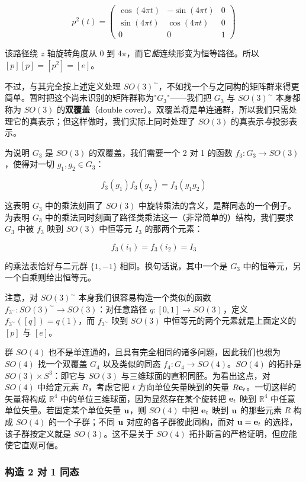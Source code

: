 \[
p^{2}(t)=\begin{pmatrix}\cos(4\pi t) & -\sin(4\pi t) & 0\\ \sin(4\pi t) & \cos(4\pi t) & 0\\ 0 & 0 & 1\end{pmatrix}
\]

该路径绕 $z$ 轴旋转角度从 0 到 $4\pi$，而它\emph{能}连续形变为恒等路径。所以 $[p][p]=[p^{2}]=[e]$。

不过，与其完全按上述定义处理 $SO(3)^{\sim}$，不如找一个与之同构的矩阵群来得更简单。暂时把这个尚未识别的矩阵群称为"$G_{3}$"——我们把 $G_{3}$ 与 $SO(3)^{\sim}$ 本身都称为 $SO(3)$ 的\textbf{双覆盖}（double cover）。双覆盖将是单连通群，所以我们只需处理它的真表示；但这样做时，我们实际上同时处理了 $SO(3)$ 的真表示\emph{与}投影表示。

为说明 $G_{3}$ 是 $SO(3)$ 的双覆盖，我们需要一个 2 对 1 的函数 $f_{3}:G_{3}\to SO(3)$，使得对一切 $g_{1},g_{2}\in G_{3}$：

\[
f_{3}(g_{1})f_{3}(g_{2})=f_{3}(g_{1}g_{2})
\]

这表明 $G_{3}$ 中的乘法刻画了 $SO(3)$ 中旋转乘法的含义，是群同态的一个例子。为表明 $G_{3}$ 中的乘法同时刻画了路径类乘法这一（非常简单的）结构，我们要求 $G_{3}$ 中被 $f_{3}$ 映到 $SO(3)$ 中恒等元 $I_{3}$ 的那两个元素：

\[
f_{3}(i_{1})=f_{3}(i_{2})=I_{3}
\]

的乘法表恰好与二元群 $\{1,-1\}$ 相同。换句话说，其中一个是 $G_{3}$ 中的恒等元，另一个自乘则给出恒等元。

注意，对 $SO(3)^{\sim}$ 本身我们很容易构造一个类似的函数 $f_{3^{\sim}}:SO(3)^{\sim}\to SO(3)$：对任意路径 $q:[0,1]\to SO(3)$，定义 $f_{3^{\sim}}([q])=q(1)$，而 $f_{3^{\sim}}$ 映到 $SO(3)$ 中恒等元的两个元素就是上面定义的 $[p]$ 与 $[e]$。

群 $SO(4)$ 也不是单连通的，且具有完全相同的诸多问题，因此我们也想为 $SO(4)$ 找一个双覆盖 $G_{4}$ 以及类似的同态 $f_{4}:G_{4}\to SO(4)$。$SO(4)$ 的拓扑是 $SO(3)\times S^{3}$：即它与 $SO(3)$ 与三维球面的直积同胚。为看出这点，对 $SO(4)$ 中给定元素 $R$，考虑它把 $t$ 方向单位矢量映到的矢量 $R\mathbf{e}_{t}$。一切这样的矢量将构成 $\mathbb{R}^{4}$ 中的单位三维球面，因为显然存在某个旋转把 $\mathbf{e}_{t}$ 映到 $\mathbb{R}^{4}$ 中任意单位矢量。若固定某个单位矢量 $\mathbf{u}$，则 $SO(4)$ 中把 $\mathbf{e}_{t}$ 映到 $\mathbf{u}$ 的那些元素 $R$ 构成 $SO(4)$ 的一个子群；不同 $\mathbf{u}$ 对应的各子群彼此同构，而对 $\mathbf{u}=\mathbf{e}_{t}$ 的选择，该子群按定义就是 $SO(3)$。这不是关于 $SO(4)$ 拓扑断言的严格证明，但应能使它直观可信。

\subsubsection{构造 2 对 1 同态}

